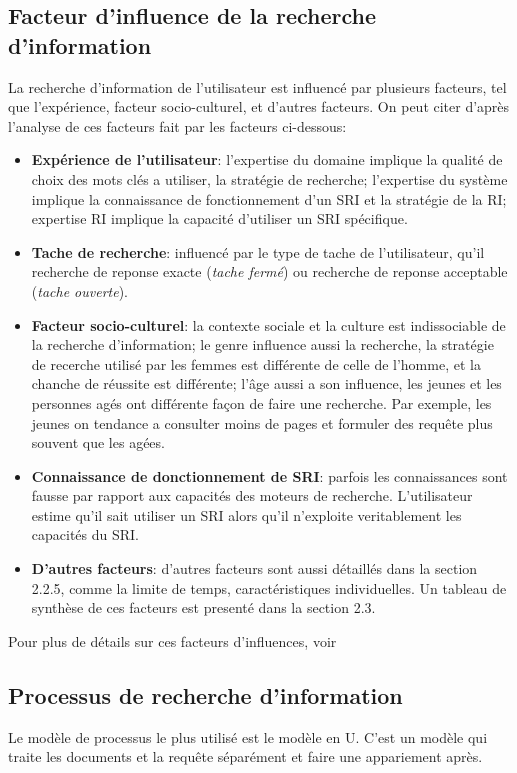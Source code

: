 \subsection{Facteur d'influence de la recherche d'information}
La recherche d'information de l'utilisateur est influencé par plusieurs facteurs, tel que l'expérience, facteur socio-culturel, et d'autres facteurs.
On peut citer d'après l'analyse de ces facteurs fait par \citeauthor{ri-sur-le-web} \citep{ri-sur-le-web} les facteurs ci-dessous:
\begin{itemize}
    \item \textbf{Expérience de l'utilisateur}: l'expertise du domaine implique la qualité de choix des mots clés a utiliser, la stratégie de recherche; l'expertise du système implique la connaissance de fonctionnement d'un SRI et la stratégie de la RI; expertise RI implique la capacité d'utiliser un SRI spécifique.
    \item \textbf{Tache de recherche}: influencé par le type de tache de l'utilisateur, qu'il recherche de reponse exacte (\textit{tache fermé}) ou recherche de reponse acceptable (\textit{tache ouverte}).
    \item \textbf{Facteur socio-culturel}: la contexte sociale et la culture est indissociable de la recherche d'information; le genre influence aussi la recherche, la stratégie de recerche utilisé par les femmes est différente de celle de l'homme, et la chanche de réussite est différente; l'âge aussi a son influence, les jeunes et les personnes agés ont différente façon de faire une recherche. Par exemple, les jeunes on tendance a consulter moins de pages et formuler des requête plus souvent que les agées.
    \item \textbf{Connaissance de donctionnement de SRI}: parfois les connaissances sont fausse par rapport aux capacités des moteurs de recherche. L'utilisateur estime qu'il sait utiliser un SRI alors qu'il n'exploite veritablement les capacités du SRI.
    \item \textbf{D'autres facteurs}: d'autres facteurs sont aussi détaillés dans la section 2.2.5, comme la limite de temps, caractéristiques individuelles. Un tableau de synthèse de ces facteurs est presenté dans la section 2.3.
\end{itemize}

Pour plus de détails sur ces facteurs d'influences, voir 

\subsection{Processus de recherche d'information}
Le modèle de processus le plus utilisé est le modèle en U. C'est un modèle qui traite les documents et la requête séparément et faire une appariement après.


